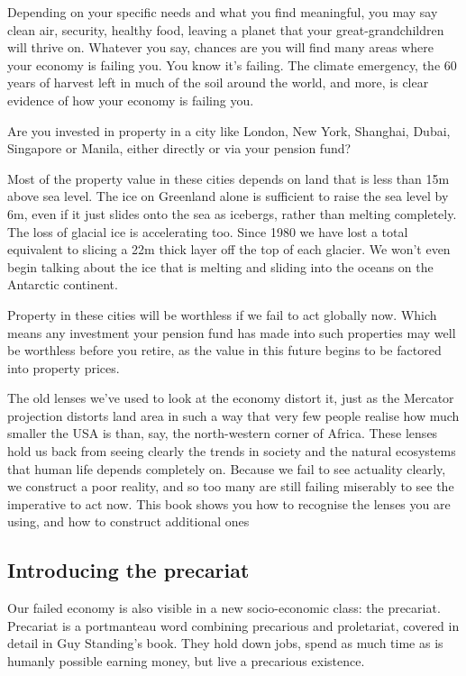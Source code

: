 Depending on your specific needs and what you find meaningful, you may say clean air, security, healthy food, leaving a planet that your great-grandchildren will thrive on. Whatever you say, chances are you will find many areas where your economy is failing you. You know it's failing. The climate emergency, the 60 years of harvest left in much of the soil around the world, and more, is clear evidence of how your economy is failing you.


Are you invested in property in a city like London, New York, Shanghai, Dubai, Singapore or Manila, either directly or via your pension fund? 


Most of the property value in these cities depends on land that is less than 15m above sea level. The ice on Greenland alone is sufficient to raise the sea level by 6m, even if it just slides onto the sea as icebergs, rather than melting completely. The loss of glacial ice is accelerating too. Since 1980 we have lost a total equivalent to slicing a 22m thick layer off the top of each glacier\cite{glacier-loss}. We won't even begin talking about the ice that is melting and sliding into the oceans on the Antarctic continent.


Property in these cities will be worthless if we fail to act globally now. Which means any investment your pension fund has made into such properties may well be worthless before you retire, as the value in this future begins to be factored into property prices.


The old lenses we've used to look at the economy distort it, just as the Mercator projection distorts land area in such a way that very few people realise how much smaller the USA is than, say, the north-western corner of Africa. These lenses hold us back from seeing clearly the trends in society and the natural ecosystems that human life depends completely on. Because we fail to see actuality clearly, we construct a poor reality, and so too many are still failing miserably to see the imperative to act now. This book shows you how to recognise the lenses you are using, and how to construct additional ones 


\subsection{Introducing the precariat}
\label{section:introducing-the-precariat}


Our failed economy is also visible in a new socio-economic class: the precariat. Precariat is a portmanteau word combining precarious and proletariat, covered in detail in Guy Standing's book\cite{standing-precariat}. They hold down jobs, spend as much time as is humanly possible earning money, but live a precarious existence. 


